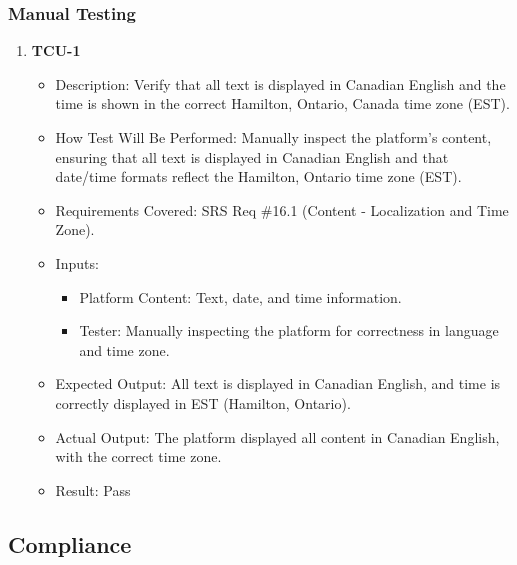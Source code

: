 \documentclass[12pt, titlepage]{article}
\begin{document}
\subsubsection{Manual Testing}
\begin{enumerate}
    \item \textbf{TCU-1}  
    \begin{itemize}
        \item Description: Verify that all text is displayed in Canadian English and the time is shown in the correct Hamilton, Ontario, Canada time zone (EST).
        \item How Test Will Be Performed: Manually inspect the platform's content, ensuring that all text is displayed in Canadian English and that date/time formats reflect the Hamilton, Ontario time zone (EST).
        \item Requirements Covered: SRS Req \#16.1 (Content - Localization and Time Zone).
        \item Inputs:  
            \begin{itemize}
                \item Platform Content: Text, date, and time information.
                \item Tester: Manually inspecting the platform for correctness in language and time zone.
            \end{itemize}
        \item Expected Output: All text is displayed in Canadian English, and time is correctly displayed in EST (Hamilton, Ontario).
        \item Actual Output: The platform displayed all content in Canadian English, with the correct time zone.
        \item Result: Pass
    \end{itemize}

\end{enumerate}

\subsection{Compliance}
\end{document}
